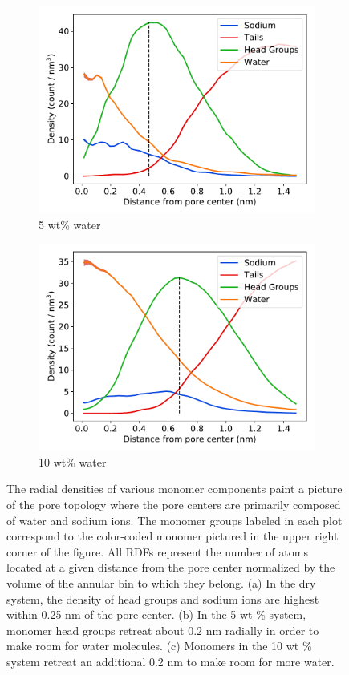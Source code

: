 \documentclass{article}
\begin{document}
\begin{figure}[!htb]
\begin{subfigure}{0.45\textwidth}
  \includegraphics[width=\textwidth]{component_density_5wt.pdf}
  \caption{5 wt\% water}\label{fig:component_density_5wt}
  \end{subfigure}
  \begin{subfigure}{0.45\textwidth}
  \includegraphics[width=\textwidth]{component_density_10wt.pdf}
  \caption{10 wt\% water}\label{fig:component_density_10wt}
  \end{subfigure}
  \caption{The radial densities of various monomer components paint a
  picture of the pore topology where the pore centers are primarily composed
  of water and sodium ions. The monomer groups labeled in each plot correspond to
  the color-coded monomer pictured in the upper right corner of the figure.
  All RDFs represent the number of atoms located at a given distance from the
  pore center normalized by the volume of the annular bin to which they belong.
  (a) In the dry system, the density of head groups and sodium ions are highest
  within 0.25 nm of the pore center. (b) In the 5 wt \% system, monomer head
  groups retreat about 0.2 nm radially in order to make room for water molecules.
  (c) Monomers in the 10 wt \% system retreat an additional 0.2 nm to make room
  for more water.}\label{fig:component_densities}
  \end{figure}
  
\end{document}

